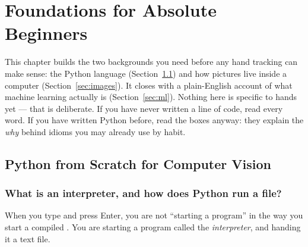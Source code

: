 \chapter{Foundations for Absolute Beginners}
\label{ch:foundations}

This chapter builds the two backgrounds you need before any hand tracking can make sense: the
Python language (Section~\ref{sec:python}) and how pictures live inside a computer
(Section~\ref{sec:images}). It closes with a plain-English account of what machine learning actually
is (Section~\ref{sec:ml}). Nothing here is specific to hands yet --- that is deliberate. If you have
never written a line of code, read every word. If you have written Python before, read the boxes
anyway: they explain the \emph{why} behind idioms you may already use by habit.

\section{Python from Scratch for Computer Vision}
\label{sec:python}

\subsection{What is an interpreter, and how does Python run a file?}

When you type  and press Enter, you are not ``starting a program'' in
the way you start a compiled . You are starting a program called the \emph{interpreter},
and handing it a text file.


